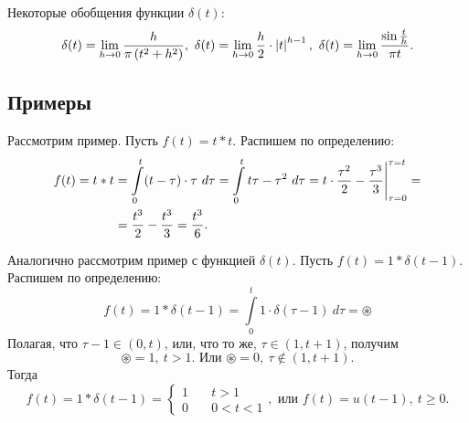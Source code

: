 	Некоторые обобщения функции $\delta(t)$:
	\[ 
		\delta(t) 
			= \lim_{h \to 0} \frac{h}{\pi \left( t^2 + h^2 \right)}, ~ \delta(t) 
			= \lim_{h \to 0} \frac{h}{2} \cdot \left\vert t \right\vert^{h - 1}, ~ \delta(t) 
			= \lim_{h \to 0} \frac{\sin{\frac{t}{h}}}{\pi t}. 
	\]

	\subsection{Примеры}

		Рассмотрим пример. Пусть $f(t) = t * t$. Распишем по определению:
		\[ \begin{split} 
			f(t) = t * t &= \int\limits_{0}^{t} (t-\tau) \cdot \tau ~ d \tau 
				= \int\limits_{0}^{t} t \tau - \tau^2 ~ d \tau 
				= t \cdot \frac{\tau^2}{2} - \frac{\tau^3}{3} \Biggl\vert \Biggr._{\tau = 0}^{\tau = t} 
				= \\ 
			&= \frac{t^3}{2} - \frac{t^3}{3} = \frac{t^3}{6}.
		\end{split} \]

		Аналогично рассмотрим пример с функцией $\delta(t)$. Пусть $f(t) = 1 * \delta(t-1)$. Распишем по определению:
		\[ f(t) = 1 * \delta(t-1) = \int\limits_{0}^{t} 1 \cdot \delta(\tau - 1) ~ d \tau = \circledast \]
		Полагая, что $\tau - 1 \in (0, t)$, или, что то же, $\tau \in (1, t+1)$, получим
		\[ \circledast = 1, ~ t > 1. \text{ Или } \circledast = 0, ~ \tau \notin (1, t+1). \]
		Тогда
		\[ f(t) = 1 * \delta(t-1) = \left\lbrace \begin{split} 1 \quad &t > 1 \\ 0 \quad &0 < t < 1 \end{split} \right., \text{ или }  f(t) = u(t-1), ~ t \ge 0. \]

